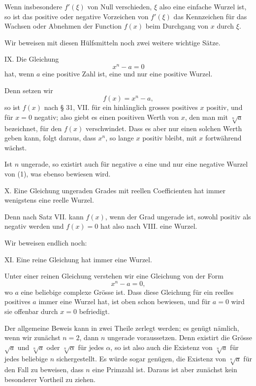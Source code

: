 \documentclass[11pt]{article}
\begin{document}
Wenn insbesondere $f'(\xi)$ von Null verschieden, $\xi$ also eine einfache Wurzel ist, so ist das positive oder negative Vorzeichen von $f'(\xi)$ das Kennzeichen für das Wachsen oder Abnehmen der Function $f(x)$ beim Durchgang von $x$ durch $\xi$.

Wir beweisen mit diesen Hülfsmitteln noch zwei weitere wichtige Sätze.

\medskip
\noindent IX. Die Gleichung
\[
 x^n-a=0
\]
hat, wenn $a$ eine positive Zahl ist, eine und nur eine positive Wurzel.
\medskip

Denn setzen wir
\begin{equation}
 f(x)=x^n-a,
\tag{1}
\end{equation}
so ist $f(x)$ nach § 31, VII. für ein hinlänglich grosses positives $x$ positiv, und für $x=0$ negativ; also giebt es einen positiven Werth von $x$, den man mit $\sqrt[n]{a}$ bezeichnet, für den $f(x)$ verschwindet. Dass es aber nur einen solchen Werth geben kann, folgt daraus, dass $x^n$, so lange $x$ positiv bleibt, mit $x$ fortwährend wächst.

Ist $n$ ungerade, so existirt auch für negative $a$ eine und nur eine negative Wurzel von (1), was ebenso bewiesen wird.

\medskip
\noindent X. Eine Gleichung ungeraden Grades mit reellen Coefficienten hat immer wenigstens eine reelle Wurzel.
\medskip

Denn nach Satz VII. kann $f(x)$, wenn der Grad ungerade ist, sowohl positiv als negativ werden und $f(x)=0$ hat also nach VIII. eine Wurzel.

Wir beweisen endlich noch:

\medskip
\noindent XI. Eine reine Gleichung hat immer eine Wurzel.
\medskip

Unter einer reinen Gleichung verstehen wir eine Gleichung von der Form
\begin{equation}
 x^n-a=0,
\tag{2}
\end{equation}
wo $a$ eine beliebige complexe Grösse ist. Dass diese Gleichung für ein reelles positives $a$ immer eine Wurzel hat, ist oben schon bewiesen, und für $a=0$ wird sie offenbar durch $x=0$ befriedigt.

Der allgemeine Beweis kann in zwei Theile zerlegt werden; es genügt nämlich, wenn wir zunächst $n=2$, dann $n$ ungerade voraussetzen. Denn existirt die Grösse $\sqrt{a}$ und $\sqrt[n]{a}$ oder $\sqrt[n]{\alpha}$ für jedes $\alpha$, so ist also auch die Existenz von $\sqrt[n]{a}$ für jedes beliebige $n$ sichergestellt. Es würde sogar genügen, die Existenz von $\sqrt[n]{a}$ für den Fall zu beweisen, dass $n$ eine Primzahl ist. Daraus ist aber zunächst kein besonderer Vortheil zu ziehen.
\end{document}
